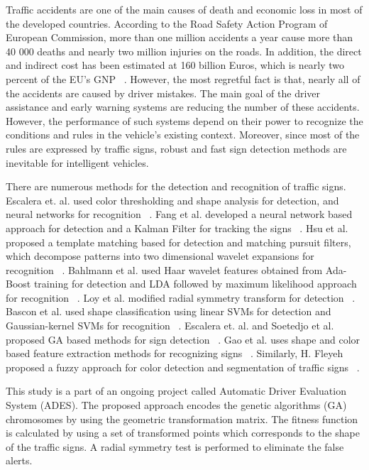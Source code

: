 \documentclass[twocolumn,letterpaper,10pt]{article}
\begin{document}
Traffic accidents are one of the main causes of death and economic loss in most of the developed countries. According to the Road Safety Action Program of European Commission, more than one million accidents a year cause more than 40 000 deaths and nearly two million injuries on the roads. In addition, the direct and indirect cost has been estimated at 160 billion Euros, which is nearly two percent of the EU's GNP ~\cite{Eu01}. However, the most regretful fact is that, nearly all of the accidents are caused by driver mistakes. The main goal of the driver assistance and early warning systems are reducing the number of these accidents. However, the performance of such systems depend on their power to recognize the conditions and rules in the vehicle's existing context. Moreover, since most of the rules are expressed by traffic signs, robust and fast sign detection methods are inevitable for intelligent vehicles.


There are numerous methods for the detection and recognition of traffic signs. Escalera et. al. used color thresholding and shape analysis for detection, and neural networks for recognition ~\cite{Delaescalera97}. Fang et al. developed a neural network based approach for detection and a Kalman Filter for tracking the signs ~\cite{Fang03}. Hsu et al. proposed a template matching based for detection and matching pursuit filters, which decompose patterns into  two dimensional wavelet expansions for recognition ~\cite{Hsu01}. Bahlmann et al. used Haar wavelet features obtained from Ada-Boost training for detection and LDA followed by maximum likelihood approach for recognition ~\cite{Bahlmann05}. Loy et al. modified radial symmetry transform for detection ~\cite{Loy04}. Bascon et al. used shape classification using linear SVMs for detection and Gaussian-kernel SVMs for recognition ~\cite{Maldonadobascon07}. Escalera et. al. and Soetedjo et al. proposed  GA based methods for sign detection ~\cite{Delaescalera03}. Gao et al. uses shape and color based feature extraction methods for recognizing signs ~\cite{Gao06}. Similarly, H. Fleyeh proposed a fuzzy approach for color detection and segmentation of traffic signs ~\cite{Fleyeh05}.


This study is a part of an ongoing project called Automatic Driver Evaluation System (ADES). The proposed approach encodes the genetic algorithms (GA) chromosomes by using the geometric transformation matrix. The fitness function is calculated by using a set of transformed points which corresponds to the shape of the traffic signs. A radial symmetry test is performed to eliminate the false alerts.
\end{document}
